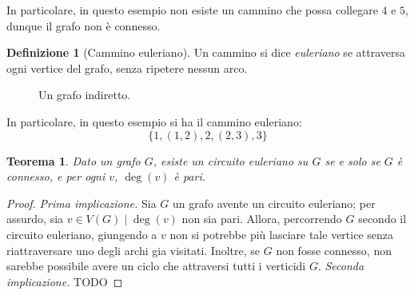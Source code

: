 \documentclass[14pt]{extreport}
\newtheorem{theorem}{Teorema}[section]
\theoremstyle{definition}
\newtheorem{definition}{Definizione}[section]
\theoremstyle{remark}
\begin{document}
In particolare, in questo esempio non esiste un cammino che possa collegare $4$ e $5$, dunque il grafo non è connesso.

\begin{definition}[Cammino euleriano]
    Un cammino si dice \textit{euleriano} se attraversa ogni vertice del grafo, senza ripetere nessun arco.
\end{definition}

\pagebreak

\begin{figure}[h]
    \centering
    \caption{Un grafo indiretto.}
\end{figure}

In particolare, in questo esempio si ha il cammino euleriano: $$\{1, (1,2), 2, (2,3), 3\}$$

\begin{theorem}
    Dato un grafo $G$, esiste un circuito euleriano su $G$ se e solo se $G$ è connesso, e per ogni $v$, $\deg(v)$ è pari.
\end{theorem}

\begin{proof}
    \textit{Prima implicazione.} Sia $G$ un grafo avente un circuito euleriano; per assurdo, sia $v \in V(G) \mid \deg(v)$ non sia pari. Allora, percorrendo $G$ secondo il circuito euleriano, giungendo a $v$ non si potrebbe più lasciare tale vertice senza riattraversare uno degli archi gia visitati. Inoltre, se $G$ non fosse connesso, non sarebbe possibile avere un ciclo che attraversi tutti i verticidi $G$. \textit{Seconda implicazione.} TODO
\end{proof}
\end{document}
